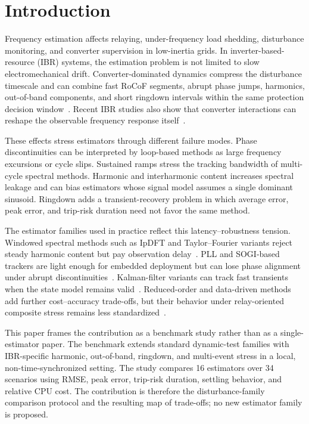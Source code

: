 \documentclass[conference,letterpaper]{IEEEtran}
\begin{document}
\section{Introduction}\label{sec:introduction}

Frequency estimation affects relaying, under-frequency load shedding,
disturbance monitoring, and converter supervision in low-inertia grids. In
inverter-based-resource (IBR) systems, the estimation problem is not limited
to slow electromechanical drift. Converter-dominated dynamics compress the
disturbance timescale and can combine fast RoCoF segments, abrupt phase jumps,
harmonics, out-of-band components, and short ringdown intervals within the
same protection decision window~\cite{Milano2018LowInertia,Pinheiro2025,Ponce2025}.
Recent IBR studies also show that converter interactions can reshape the
observable frequency response itself~\cite{Bernal2025,Zoghby2024}.

These effects stress estimators through different failure modes. Phase
discontinuities can be interpreted by loop-based methods as large frequency
excursions or cycle slips. Sustained ramps stress the tracking bandwidth of
multi-cycle spectral methods. Harmonic and interharmonic content increases
spectral leakage and can bias estimators whose signal model assumes a single
dominant sinusoid. Ringdown adds a transient-recovery problem in which average
error, peak error, and trip-risk duration need not favor the same method.

The estimator families used in practice reflect this latency--robustness
tension. Windowed spectral methods such as IpDFT and Taylor--Fourier variants
reject steady harmonic content but pay observation delay~\cite{Belega2014,PlatasGarza2011}.
PLL and SOGI-based trackers are light enough for embedded deployment but can
lose phase alignment under abrupt discontinuities~\cite{Golestan2017,Wright2019}.
Kalman-filter variants can track fast transients when the state model remains
valid~\cite{Ferrero2020EKF,Chamorro2021}. Reduced-order and data-driven methods
add further cost--accuracy trade-offs, but their behavior under
relay-oriented composite stress remains less standardized~\cite{Netto2018KoopmanKF,Ting2022}.

This paper frames the contribution as a benchmark study rather than as a
single-estimator paper. The benchmark extends standard dynamic-test families
with IBR-specific harmonic, out-of-band, ringdown, and multi-event stress in a
local, non-time-synchronized setting. The study compares 16 estimators over 34
scenarios using RMSE, peak error, trip-risk duration, settling behavior, and
relative CPU cost. The contribution is therefore the disturbance-family
comparison protocol and the resulting map of trade-offs; no new estimator
family is proposed.
\end{document}
